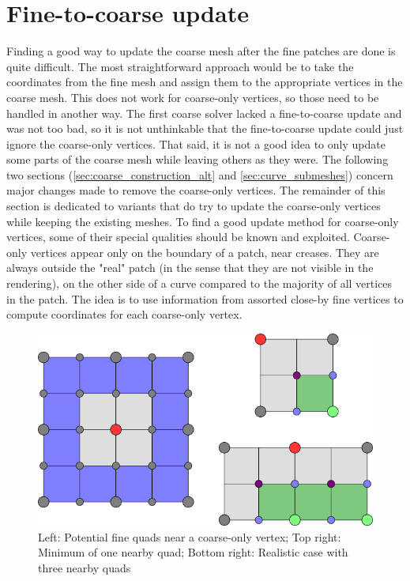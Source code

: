 \documentclass[a4paper,twoside,12pt,nochapterprefix]{scrbook}
\begin{document}
\section{Fine-to-coarse update}\label{ftc_update}
Finding a good way to update the coarse mesh after the fine patches are done is quite difficult. The most straightforward approach would be to take the coordinates from the fine mesh and assign them to the appropriate vertices in the coarse mesh. This does not work for coarse-only vertices, so those need to be handled in another way.\newline
The first coarse solver lacked a fine-to-coarse update and was not too bad, so it is not unthinkable that the fine-to-coarse update could just ignore the coarse-only vertices. That said, it is not a good idea to only update some parts of the coarse mesh while leaving others as they were.\newline
The following two sections (\ref{sec:coarse_construction_alt} and \ref{sec:curve_submeshes}) concern major changes made to remove the coarse-only vertices. The remainder of this section is dedicated to variants that do try to update the coarse-only vertices while keeping the existing meshes.\newline
To find a good update method for coarse-only vertices, some of their special qualities should be known and exploited. Coarse-only vertices appear only on the boundary of a patch, near creases. They are always outside the "real" patch (in the sense that they are not visible in the rendering), on the other side of a curve compared to the majority of all vertices in the patch. The idea is to use information from assorted close-by fine vertices to compute coordinates for each coarse-only vertex.\newline
\begin{figure}
    \centering
    \includegraphics[width=0.75\linewidth]{figures/0221_nearby_fine_quads}
    \caption{Left: Potential fine quads near a coarse-only vertex; Top right: Minimum of one nearby quad; Bottom right: Realistic case with three nearby quads
      \label{fig:coarseonly_neighbourhood}}
\end{figure}
\end{document}
